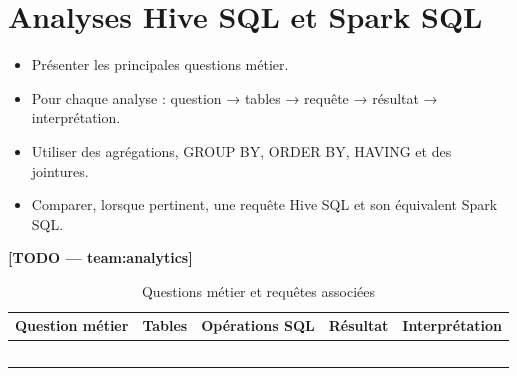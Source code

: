 \section{Analyses Hive SQL et Spark SQL}
\begin{itemize}
  \item Présenter les principales questions métier.
  \item Pour chaque analyse : question → tables → requête → résultat → interprétation.
  \item Utiliser des agrégations, GROUP BY, ORDER BY, HAVING et des jointures.
  \item Comparer, lorsque pertinent, une requête Hive SQL et son équivalent Spark SQL.
\end{itemize}
\textbf{[TODO — team:analytics]}

\begin{longtable}{p{3cm}p{2cm}p{3cm}p{2.5cm}p{3.5cm}}
\caption{Questions métier et requêtes associées} \\
\toprule
Question métier & Tables & Opérations SQL & Résultat & Interprétation \\
\midrule
\endhead
 & & & & \\
 & & & & \\
 & & & & \\
 & & & & \\
 & & & & \\
\bottomrule
\end{longtable}

